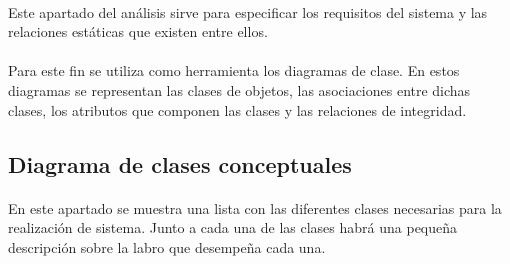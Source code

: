 \paragraph{}
Este apartado del análisis sirve para especificar los requisitos del sistema y las relaciones estáticas que
existen entre ellos.

\paragraph{}
Para este fin se utiliza como herramienta los diagramas de clase. En estos diagramas se representan
las clases de objetos, las asociaciones entre dichas clases, los atributos que componen las clases y las
relaciones de integridad.


\subsection{Diagrama de clases conceptuales}

\paragraph{}
En este apartado se muestra una lista con las diferentes clases necesarias para la realización de sistema. Junto a cada una de
las clases habrá una pequeña descripción sobre la labro que desempeña cada una.

